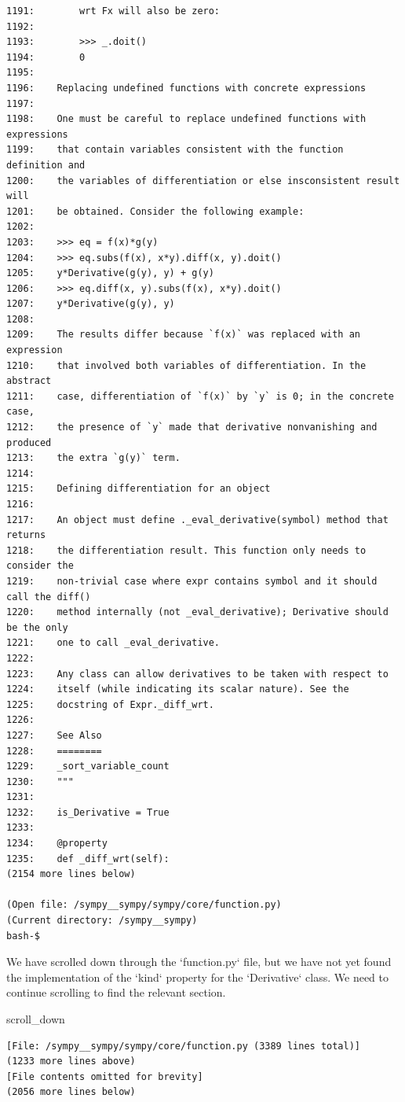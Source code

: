 {\begin{observationbox}
\begin{Verbatim}[breaklines=true, breakanywhere=true]
1191:        wrt Fx will also be zero:
1192:
1193:        >>> _.doit()
1194:        0
1195:
1196:    Replacing undefined functions with concrete expressions
1197:
1198:    One must be careful to replace undefined functions with expressions
1199:    that contain variables consistent with the function definition and
1200:    the variables of differentiation or else insconsistent result will
1201:    be obtained. Consider the following example:
1202:
1203:    >>> eq = f(x)*g(y)
1204:    >>> eq.subs(f(x), x*y).diff(x, y).doit()
1205:    y*Derivative(g(y), y) + g(y)
1206:    >>> eq.diff(x, y).subs(f(x), x*y).doit()
1207:    y*Derivative(g(y), y)
1208:
1209:    The results differ because `f(x)` was replaced with an expression
1210:    that involved both variables of differentiation. In the abstract
1211:    case, differentiation of `f(x)` by `y` is 0; in the concrete case,
1212:    the presence of `y` made that derivative nonvanishing and produced
1213:    the extra `g(y)` term.
1214:
1215:    Defining differentiation for an object
1216:
1217:    An object must define ._eval_derivative(symbol) method that returns
1218:    the differentiation result. This function only needs to consider the
1219:    non-trivial case where expr contains symbol and it should call the diff()
1220:    method internally (not _eval_derivative); Derivative should be the only
1221:    one to call _eval_derivative.
1222:
1223:    Any class can allow derivatives to be taken with respect to
1224:    itself (while indicating its scalar nature). See the
1225:    docstring of Expr._diff_wrt.
1226:
1227:    See Also
1228:    ========
1229:    _sort_variable_count
1230:    """
1231:
1232:    is_Derivative = True
1233:
1234:    @property
1235:    def _diff_wrt(self):
(2154 more lines below)

(Open file: /sympy__sympy/sympy/core/function.py)
(Current directory: /sympy__sympy)
bash-$
\end{Verbatim}
\end{observationbox}
\begin{agentbox}
We have scrolled down through the `function.py` file, but we have not yet found the implementation of the `kind` property for the `Derivative` class. We need to continue scrolling to find the relevant section.



\hrulefill
\begin{CodeVerbatim}[breaklines=true, breakanywhere=true]
scroll_down
\end{CodeVerbatim}
\end{agentbox}
\begin{observationbox}\begin{Verbatim}[breaklines=true, breakanywhere=true]
[File: /sympy__sympy/sympy/core/function.py (3389 lines total)]
(1233 more lines above)
[File contents omitted for brevity]
(2056 more lines below)


\end{Verbatim}
\end{observationbox}}
